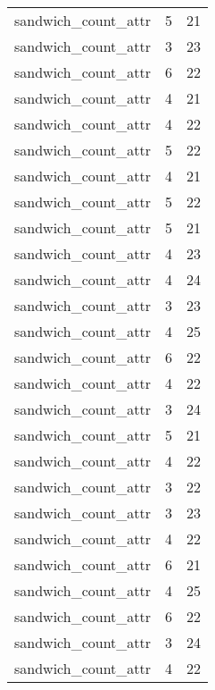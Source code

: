 \begin{table}
\begin{tabular}{lrr}
             sandwich\_count\_attr &         5 &        21 \\
             sandwich\_count\_attr &         3 &        23 \\
             sandwich\_count\_attr &         6 &        22 \\
             sandwich\_count\_attr &         4 &        21 \\
             sandwich\_count\_attr &         4 &        22 \\
             sandwich\_count\_attr &         5 &        22 \\
             sandwich\_count\_attr &         4 &        21 \\
             sandwich\_count\_attr &         5 &        22 \\
             sandwich\_count\_attr &         5 &        21 \\
             sandwich\_count\_attr &         4 &        23 \\
             sandwich\_count\_attr &         4 &        24 \\
             sandwich\_count\_attr &         3 &        23 \\
             sandwich\_count\_attr &         4 &        25 \\
             sandwich\_count\_attr &         6 &        22 \\
             sandwich\_count\_attr &         4 &        22 \\
             sandwich\_count\_attr &         3 &        24 \\
             sandwich\_count\_attr &         5 &        21 \\
             sandwich\_count\_attr &         4 &        22 \\
             sandwich\_count\_attr &         3 &        22 \\
             sandwich\_count\_attr &         3 &        23 \\
             sandwich\_count\_attr &         4 &        22 \\
             sandwich\_count\_attr &         6 &        21 \\
             sandwich\_count\_attr &         4 &        25 \\
             sandwich\_count\_attr &         6 &        22 \\
             sandwich\_count\_attr &         3 &        24 \\
             sandwich\_count\_attr &         4 &        22 \\

\end{tabular}
\end{table}
